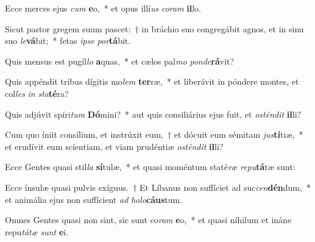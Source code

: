 \item Ecce merces ejus \textit{cum} \textbf{e}o,~* et opus illí\textit{us} \textit{co}\textit{ram} \textbf{il}lo.
\item Sicut pastor gregem suum pascet:~† in bráchio suo congregábit agnos, et in sinu suo \textit{le}\textbf{vá}bit;~* fetas \textit{ip}\textit{se} \textit{por}\textbf{tá}bit.
\item Quis mensus est pugíl\textit{lo} \textbf{a}quas,~* et cælos pal\textit{mo} \textit{pon}\textit{de}\textbf{rá}vit?
\item Quis appéndit tribus dígitis mo\textit{lem} \textbf{ter}ræ,~* et liberávit in póndere montes, et col\textit{les} \textit{in} \textit{sta}\textbf{té}ra?
\item Quis adjúvit spíri\textit{tum} \textbf{Dó}mini?~* aut quis consiliárius ejus fuit, et \textit{os}\textit{tén}\textit{dit} \textbf{il}li?
\item Cum quo íniit consílium, et instrúxit eum,~† et dócuit eum sémitam \textit{jus}\textbf{tí}tiæ,~* et erudívit eum scíentiam, et viam prudéntiæ \textit{os}\textit{tén}\textit{dit} \textbf{il}li?
\item Ecce Gentes quasi stil\textit{la} \textbf{sí}tulæ,~* et quasi moméntum staté\textit{ræ} \textit{re}\textit{pu}\textbf{tá}tæ sunt:
\item Ecce ínsulæ quasi pulvis exíguus.~† Et Líbanus non suffíciet ad suc\textit{cen}\textbf{dén}dum,~* et animália ejus non suffícient \textit{ad} \textit{ho}\textit{lo}\textbf{cáus}tum.
\item Omnes Gentes quasi non sint, sic sunt co\textit{ram} \textbf{e}o,~* et quasi níhilum et ináne repu\textit{tá}\textit{tæ} \textit{sunt} \textbf{e}i.
